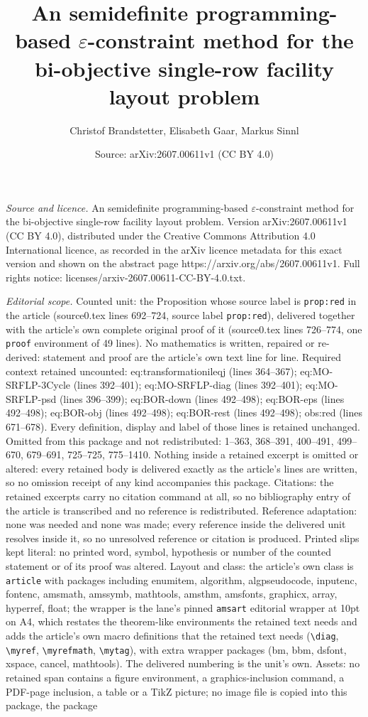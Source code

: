 \documentclass[10pt,a4paper]{amsart}
\title[An semidefinite programming-based $\varepsilon$-constraint m]{An semidefinite programming-based $\varepsilon$-constraint method for the bi-objective single-row facility layout problem}
\author{Christof Brandstetter, Elisabeth Gaar, Markus Sinnl}
\date{Source: arXiv:2607.00611v1 (CC BY 4.0)}
\begin{document}
\maketitle

\noindent\emph{Source and licence.} An semidefinite programming-based $\varepsilon$-constraint method for the bi-objective single-row facility layout problem. Version arXiv:2607.00611v1 (CC BY 4.0), distributed under the Creative Commons Attribution 4.0 International licence, as recorded in the arXiv licence metadata for this exact version and shown on the abstract page https://arxiv.org/abs/2607.00611v1. Full rights notice: licenses/arxiv-2607.00611-CC-BY-4.0.txt.\par\smallskip

\noindent\textit{Editorial scope.} Counted unit: the Proposition whose source label is \texttt{prop:red} in the article (source0.tex lines 692--724, source label \texttt{prop:red}), delivered together with the article's own complete original proof of it (source0.tex lines 726--774, one \texttt{proof} environment of 49 lines). No mathematics is written, repaired or re-derived: statement and proof are the article's own text line for line. Required context retained uncounted: eq:transformationileqj (lines 364--367); eq:MO-SRFLP-3Cycle (lines 392--401); eq:MO-SRFLP-diag (lines 392--401); eq:MO-SRFLP-psd (lines 396--399); eq:BOR-down (lines 492--498); eq:BOR-eps (lines 492--498); eq:BOR-obj (lines 492--498); eq:BOR-rest (lines 492--498); obs:red (lines 671--678). Every definition, display and label of those lines is retained unchanged. Omitted from this package and not redistributed: 1--363, 368--391, 400--491, 499--670, 679--691, 725--725, 775--1410. Nothing inside a retained excerpt is omitted or altered: every retained body is delivered exactly as the article's lines are written, so no omission receipt of any kind accompanies this package. Citations: the retained excerpts carry no citation command at all, so no bibliography entry of the article is transcribed and no reference is redistributed. Reference adaptation: none was needed and none was made; every reference inside the delivered unit resolves inside it, so no unresolved reference or citation is produced. Printed slips kept literal: no printed word, symbol, hypothesis or number of the counted statement or of its proof was altered. Layout and class: the article's own class is \texttt{article} with packages including enumitem, algorithm, algpseudocode, inputenc, fontenc, amsmath, amssymb, mathtools, amsthm, amsfonts, graphicx, array, hyperref, float; the wrapper is the lane's pinned \texttt{amsart} editorial wrapper at 10pt on A4, which restates the theorem-like environments the retained text needs and adds the article's own macro definitions that the retained text needs (\texttt{\textbackslash diag}, \texttt{\textbackslash myref}, \texttt{\textbackslash myrefmath}, \texttt{\textbackslash mytag}), with extra wrapper packages (bm, bbm, dsfont, xspace, cancel, mathtools). The delivered numbering is the unit's own. Assets: no retained span contains a figure environment, a graphics-inclusion command, a PDF-page inclusion, a table or a TikZ picture; no image file is copied into this package, the package 
\end{document}
